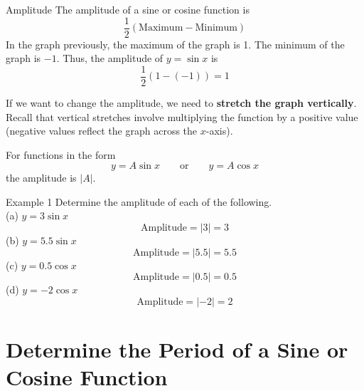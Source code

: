 \documentclass[t,usenames,dvipsnames]{beamer}
\begin{document}
\begin{frame}{Amplitude}
The \alert{amplitude} of a sine or cosine function is 
\[
\frac{1}{2}\left(\text{Maximum} - \text{Minimum}   \right)
\]
\pause
In the graph previously, the maximum of the graph is 1. The minimum of the graph is $-1$. Thus, the amplitude of $y=\sin x$ is
\[
\frac{1}{2}\left(1 - (-1)\right) = 1
\]
\end{frame}

\begin{frame}
If we want to change the amplitude, we need to \textbf{stretch the graph vertically}. Recall that vertical stretches involve multiplying the function by a positive value (negative values reflect the graph across the $x$-axis).  \newline\\   \pause

For functions in the form
\[
y = A\sin x \qquad \text{or} \qquad y = A\cos x
\]
the amplitude is $|A|$.
\end{frame}

\begin{frame}{Example 1}
Determine the amplitude of each of the following.   \newline\\
(a) \quad $y = 3\sin x$ \pause
\[
\text{Amplitude} = |3| = 3
\]
\pause
(b) \quad $y = 5.5\sin x$   \pause
\[
\text{Amplitude} = |5.5| = 5.5
\]
\pause
(c) \quad $y = 0.5\cos x$   \pause
\[
\text{Amplitude} = |0.5| = 0.5
\]
\pause
(d) \quad $y = -2\cos x$    \pause
\[
\text{Amplitude} = |-2| = 2
\]
\end{frame} 

\section{Determine the Period of a Sine or Cosine Function}
\end{document}
